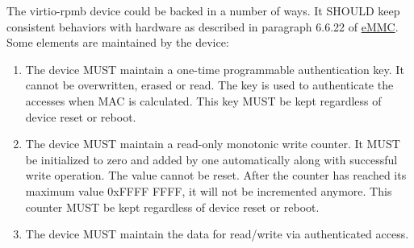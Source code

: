 The virtio-rpmb device could be backed in a number of ways. It SHOULD
   keep consistent behaviors with hardware as described in paragraph
   6.6.22 of \hyperref[intro:eMMC]{eMMC}.
   Some elements are maintained by the device:
\begin{enumerate}
\item The device MUST maintain a one-time programmable authentication key.
   It cannot be overwritten, erased or read. The key is used to
   authenticate the accesses when MAC is calculated. This key MUST be
   kept regardless of device reset or reboot.
\item The device MUST maintain a read-only monotonic write counter. It
  MUST be initialized to zero and added by one automatically along with
   successful write operation. The value cannot be reset. After
   the counter has reached its maximum value 0xFFFF FFFF, it will
   not be incremented anymore. This counter MUST be kept regardless
   of device reset or reboot.
\item The device MUST maintain the data for read/write via authenticated
   access.
\end{enumerate}
